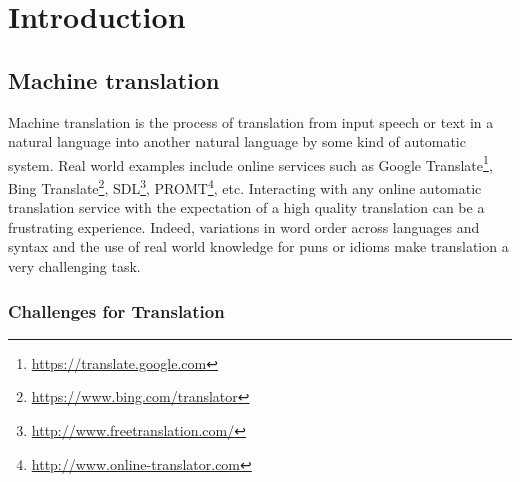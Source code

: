 \chapter{Introduction}
\label{chap:intro}

\section{Machine translation}



Machine translation is the process of translation from input
speech or text in a natural language into another natural language
by some kind of automatic system.
Real world examples include online services such as
Google Translate\footnote{\url{https://translate.google.com}},
Bing Translate\footnote{\url{https://www.bing.com/translator}},
SDL\footnote{\url{http://www.freetranslation.com/}},
PROMT\footnote{\url{http://www.online-translator.com}}, etc.
Interacting with any online automatic translation service with
the expectation of a high quality translation can be a frustrating
experience. Indeed, variations
in word order across languages and syntax and the use of real world knowledge
for puns or idioms make translation a very challenging task.

\subsection{Challenges for Translation}

